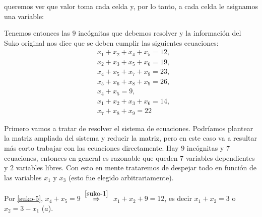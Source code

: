 \begin{enumerate}[topsep=6pt, itemsep=.4cm]
\rta queremos ver que valor toma cada celda y, por lo tanto,  a cada celda le asignamos una variable:
\begin{center}
\end{center}
Tenemos entonces las $9$ incógnitas que debemos resolver y la información del Suko original nos dice que se deben cumplir las siguientes ecuaciones:
\begin{align}
&x_1 + x_2 +x_4 +x_5 =12, \label{suko-1} \\
&x_2+ x_3+x_5 +x_6 = 19, \label{suko-2}\\
&x_4 +x_5 +x_7 + x_8 = 23, \label{suko-3}\\
&x_5 +x_6 +x_8 + x_9 = 26, \label{suko-4}\\
&x_4 + x_5 = 9, \label{suko-5}\\
&x_1+x_2 +x_3 +x_6 = 14, \label{suko-6}\\
&x_7+ x_8 + x_9 = 22\label{suko-7}
\end{align}


Primero vamos a tratar de resolver el sistema de ecuaciones. Podríamos plantear  la matriz ampliada del sistema y  reducir la matriz, pero en este caso va a resultar más corto trabajar con las ecuaciones directamente. Hay $9$ incógnitas y $7$ ecuaciones, entonces en general es razonable que queden $7$ variables dependientes y $2$ variables libres. Con esto en mente trataremos de despejar todo en función de las variables $x_1$ y $x_3$ (esto fue elegido arbitrariamente). 


Por \eqref{suko-5}, $x_4 + x_5 = 9$ $\;\stackrel{\eqref{suko-1}}{\Rightarrow}\;$ $x_1 + x_2 + 9 =12$,  es decir $x_1 + x_2  =3$ o \colorbox{green!20}{$x_2 = 3 -x_1$ ($a$)}.



\end{enumerate}
